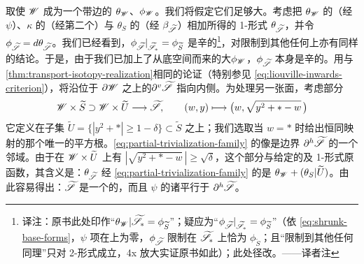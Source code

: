 取使 $\mathscr{W}$ 成为一个带边\trExactSymplectic\trManifold{}的 $\theta_{\mathscr{W}}$、$\phi_{\mathscr{W}}$。我们将假定它们足够大。考虑把 $\theta_{\mathscr{W}}$ 的\trPullback（经 $\psi$）、$\kappa$ 的\trPullback（经第二个\trProjection）与 $\theta_S$ 的\trPullback（经 $\beta_{\widetilde{\mathscr{S}}}$）相加所得的 1-形式 $\theta_{\widetilde{\mathscr{S}}}$，并令 $\phi_{\widetilde{\mathscr{S}}}=d\theta_{\widetilde{\mathscr{S}}}$。我们已经看到，$\phi_{\widetilde{\mathscr{S}}}|_{\widetilde{\mathscr{S}}_*}=\phi_{\widetilde{S}}$ 是辛的\footnote{译注：原书此处印作“$\theta_{\mathscr{W}}|\widetilde{\mathscr{S}}_*=\phi_{\widetilde{S}}$”；疑应为“$\phi_{\widetilde{\mathscr{S}}}|_{\widetilde{\mathscr{S}}_*}=\phi_{\widetilde{S}}$”（依 \eqref{eq:shrunk-base-forms}，$\psi$ 项在\trFiber{}上为零，$\phi_{\widetilde{\mathscr{S}}}$ 限制在 $\widetilde{\mathscr{S}}_*$ 上恰为 $\phi_{\widetilde{S}}$；且“限制到其他任何\trFiber{}同理”只对 2-形式成立，4x 放大实证原书如此）；此处径改。——译者注}，对限制到其他任何\trFiber{}上亦有同样的结论。于是，由于我们已加上了从底空间\trPullback{}而来的大\trSymplecticForm{}$\phi_{\mathscr{W}}$，$\phi_{\widetilde{\mathscr{S}}}$ 本身是辛的。用与\cref{thm:transport-isotopy-realization}相同的论证（特别参见 \eqref{eq:liouville-inwards-criterion}），\trLiouville\trVectorField{}将沿位于 $\partial\mathscr{W}$ 之上的\trBoundaryFace{}$\partial^v\widetilde{\mathscr{S}}$ 指向内侧。为处理另一张面，考虑部分\trTrivialization
\begin{equation}\label{eq:partial-trivialization-family}
\mathscr{W}\times\widetilde{S}\supset\mathscr{W}\times\widetilde{U}\longrightarrow\widetilde{\mathscr{S}},\qquad
(w,y)\longmapsto\bigl(w,\sqrt{y^2+*-w}\,\bigr)
\end{equation}
它定义在子集 $\widetilde{U}=\{|y^2+*|\ge 1-\delta\}\subset\widetilde{S}$ 之上；我们选取当 $w=*$ 时给出恒同映射的那个唯一的平方根。\eqref{eq:partial-trivialization-family} 的像是\trFibrewise{}边界 $\partial^h\widetilde{\mathscr{S}}$ 的一个邻域。由于在 $\mathscr{W}\times\widetilde{U}$ 上有 $|\sqrt{y^2+*-w}\,|\ge\sqrt{\delta}$，这个部分\trTrivialization{}与给定的\trSymplecticStructure{}及 1-形式原函数\trCompatible，其含义是：$\theta_{\widetilde{\mathscr{S}}}$ 经 \eqref{eq:partial-trivialization-family} 的\trPullback{}是 $\theta_{\mathscr{W}}+(\theta_S|\widetilde{U})$。由此容易得出：$\widetilde{\mathscr{S}}$ 是一个\trCorneredBoundary{}的\trExactSymplectic\trManifold，而且 $\psi$ 的诸\trHorizontal\trTangentSpace{}平行于 $\partial^h\widetilde{\mathscr{S}}$。
